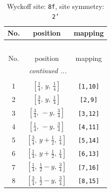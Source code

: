 \documentclass[fleqn,8pt]{jsarticle}
\begin{document}
\begin{longtable}{ccc}
\caption{Wyckoff site: {\tt 8f}, site symmetry: {\tt 2'}}
 \\
 \hline \hline
No. & position & mapping \\ \hline \endfirsthead

\multicolumn{2}{l}{\tablename\ \thetable{}} \\
 \hline \hline
No. & position & mapping \\ \hline \endhead

 \hline \hline
\multicolumn{2}{r}{\footnotesize\it continued ...} \\ \endfoot

 \hline \hline
\multicolumn{2}{r}{} \\ \endlastfoot

1 & $\left[ \frac{1}{4},\, y,\, \frac{1}{4} \right]$ & {\tt [1,10]} \\ \hline
2 & $\left[ \frac{3}{4},\, y,\, \frac{1}{4} \right]$ & {\tt [2,9]} \\ \hline
3 & $\left[ \frac{3}{4},\, - y,\, \frac{3}{4} \right]$ & {\tt [3,12]} \\ \hline
4 & $\left[ \frac{1}{4},\, - y,\, \frac{3}{4} \right]$ & {\tt [4,11]} \\ \hline
5 & $\left[ \frac{3}{4},\, y + \frac{1}{2},\, \frac{1}{4} \right]$ & {\tt [5,14]} \\ \hline
6 & $\left[ \frac{1}{4},\, y + \frac{1}{2},\, \frac{1}{4} \right]$ & {\tt [6,13]} \\ \hline
7 & $\left[ \frac{1}{4},\, \frac{1}{2} - y,\, \frac{3}{4} \right]$ & {\tt [7,16]} \\ \hline
8 & $\left[ \frac{3}{4},\, \frac{1}{2} - y,\, \frac{3}{4} \right]$ & {\tt [8,15]} \\
\end{longtable}
\renewcommand{\arraystretch}{1.2}
\end{document}
